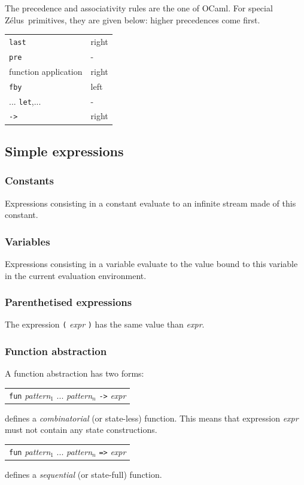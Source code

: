 \documentclass[11pt,titlepage,twoside]{report}
\newcommand{\zelus}{{\sf Z\'elus}}
\newcommand{\ocaml}{{\sf OCaml}}
\newcommand{\Let}{\mbox{{\tt let}}}
\newcommand{\Pre}{\mbox{{\tt pre}}}
\newcommand{\Last}{\mbox{{\tt last}}}
\newcommand{\Fby}{\mbox{{\tt fby}}}
\newcommand{\Minusgreater}{\mbox{{\tt ->}}}
\newcommand{\term}[1]{{\tt #1}}
\newcommand{\nterm}[1]{{\em #1}}
\begin{document}
The precedence and associativity rules are the one of \ocaml. For
special \zelus\ primitives, they are given below:
higher precedences come first.
\begin{center}
{
\begin{tabular}{|l|l|} \hline
\Last                           & right         \\
\Pre                            & -             \\
function application            & right         \\
\Fby                            & left          \\
...
\Let,...                        & -             \\ 
\Minusgreater                   & right         \\ \hline
\end{tabular}
}
\end{center}

\subsection{Simple expressions}

\subsubsection{Constants}
Expressions consisting in a constant evaluate to an infinite stream
made of this constant.

\subsubsection{Variables}
Expressions consisting in a variable evaluate to the value bound to
this variable in the current evaluation environment.

\subsubsection{Parenthetised expressions}
The expression \term{(} \nterm{expr} \term{)} has the same value than
\nterm{expr}.

\subsubsection{Function abstraction}
A function abstraction has two forms: 
\begin{center}
\begin{tabular}{l}
\term{fun} \nterm{pattern}$_1$ ... \nterm{pattern}$_n$ \term{->} \nterm{expr}
\end{tabular}
\end{center}
defines a {\em combinatorial} (or state-less) function. This means
that expression \nterm{expr} must not contain any state constructions.
\begin{center}
\begin{tabular}{l}
\term{fun} \nterm{pattern}$_1$ ... \nterm{pattern}$_n$ \term{=>} \nterm{expr}
\end{tabular}
\end{center}
defines a {\em sequential} (or state-full) function.
\end{document}

